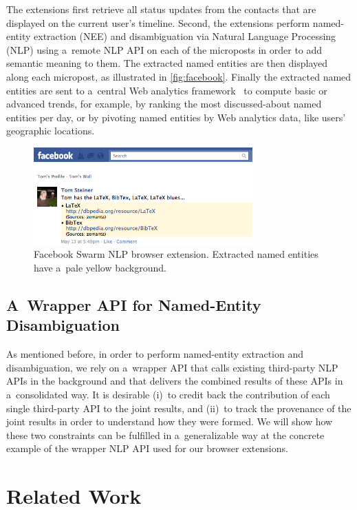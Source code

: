 The extensions first retrieve all status updates
from the contacts that are displayed
on the current user's timeline.
Second, the extensions perform named-entity extraction (NEE)
and disambiguation via Natural Language Processing (NLP)
using a~remote NLP API on each of the microposts
in order to add semantic meaning to them.
The extracted named entities are then displayed
along each micropost, as illustrated in \autoref{fig:facebook}.
Finally the extracted named entities
are sent to a~central Web analytics framework~\cite{kaushik2009analytics}
to compute basic or advanced trends, for example,
by ranking the most discussed-about named entities per day,
or by pivoting named entities by Web analytics data,
like users' geographic locations.

\begin{figure}[htb!]
  \centering
  \includegraphics[width=0.75\textwidth]{facebook-swarm-nlp.png}
  \caption[Facebook Swarm NLP browser extension]
    {Facebook Swarm NLP browser extension.
    Extracted named entities have a~pale yellow background.}     
  \label{fig:facebook}
\end{figure}

\subsection{A~Wrapper API for Named-Entity Disambiguation}

As mentioned before, in order to perform named-entity extraction
and disambiguation, we rely on a~wrapper API
that calls existing third-party NLP APIs in the background
and that delivers the combined results of these APIs
in a~consolidated way.
It is  desirable
(i)~to credit back the contribution of each single third-party API
to the joint results, and
(ii)~to track the provenance of the joint results
in order to understand how they were formed.
We will show how these two constraints
can be fulfilled in a~generalizable way
at the concrete example of the wrapper NLP API
used for our browser extensions.

\section{Related Work}

